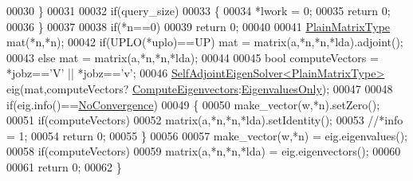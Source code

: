 \begin{DoxyCode}
00030   \}
00031   
00032   \textcolor{keywordflow}{if}(query\_size)
00033   \{
00034     *lwork = 0;
00035     \textcolor{keywordflow}{return} 0;
00036   \}
00037   
00038   \textcolor{keywordflow}{if}(*n==0)
00039     \textcolor{keywordflow}{return} 0;
00040   
00041   \hyperlink{group___core___module_class_eigen_1_1_matrix}{PlainMatrixType} mat(*n,*n);
00042   \textcolor{keywordflow}{if}(UPLO(*uplo)==UP) mat = matrix(a,*n,*n,*lda).adjoint();
00043   \textcolor{keywordflow}{else}                mat = matrix(a,*n,*n,*lda);
00044   
00045   \textcolor{keywordtype}{bool} computeVectors = *jobz==\textcolor{charliteral}{'V'} || *jobz==\textcolor{charliteral}{'v'};
00046   \hyperlink{group___eigenvalues___module_class_eigen_1_1_self_adjoint_eigen_solver}{SelfAdjointEigenSolver<PlainMatrixType>} eig(mat,computeVectors?
      \hyperlink{group__enums_ggae3e239fb70022eb8747994cf5d68b4a9ada93d8885bde32b876ba4af01d3292cc}{ComputeEigenvectors}:\hyperlink{group__enums_ggae3e239fb70022eb8747994cf5d68b4a9ad0c82cf0a9daf2a63bb6e2f10d51f69c}{EigenvaluesOnly});
00047   
00048   \textcolor{keywordflow}{if}(eig.info()==\hyperlink{group__enums_gga85fad7b87587764e5cf6b513a9e0ee5eaba1c8763d1179778070f365ecc4157a8}{NoConvergence})
00049   \{
00050     make\_vector(w,*n).setZero();
00051     \textcolor{keywordflow}{if}(computeVectors)
00052       matrix(a,*n,*n,*lda).setIdentity();
00053     \textcolor{comment}{//*info = 1;}
00054     \textcolor{keywordflow}{return} 0;
00055   \}
00056   
00057   make\_vector(w,*n) = eig.eigenvalues();
00058   \textcolor{keywordflow}{if}(computeVectors)
00059     matrix(a,*n,*n,*lda) = eig.eigenvectors();
00060   
00061   \textcolor{keywordflow}{return} 0;
00062 \}
\end{DoxyCode}
